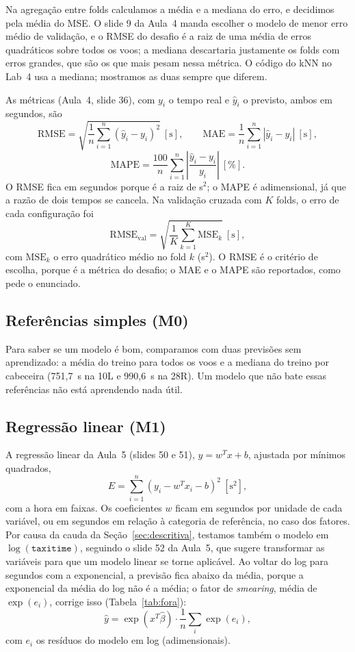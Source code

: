 \documentclass[12pt,a4paper]{article}
\begin{document}
Na agregação entre folds calculamos a média e a mediana do erro, e decidimos pela média do MSE. O slide 9 da Aula~4 manda escolher o modelo de menor erro médio de validação, e o RMSE do desafio é a raiz de uma média de erros quadráticos sobre todos os voos; a mediana descartaria justamente os folds com erros grandes, que são os que mais pesam nessa métrica. O código do kNN no Lab~4 usa a mediana; mostramos as duas sempre que diferem.

As métricas (Aula~4, slide 36), com $y_i$ o tempo real e $\hat{y}_i$ o previsto, ambos em segundos, são
\[
\text{RMSE} = \sqrt{\frac{1}{n}\sum_{i=1}^{n}(\hat{y}_i-y_i)^2}\ [\text{s}],\qquad
\text{MAE} = \frac{1}{n}\sum_{i=1}^{n}|\hat{y}_i-y_i|\ [\text{s}],
\]
\[
\text{MAPE} = \frac{100}{n}\sum_{i=1}^{n}\left|\frac{\hat{y}_i-y_i}{y_i}\right|\ [\%].
\]
O RMSE fica em segundos porque é a raiz de s$^2$; o MAPE é adimensional, já que a razão de dois tempos se cancela. Na validação cruzada com $K$ folds, o erro de cada configuração foi
\[
\text{RMSE}_{\text{val}} = \sqrt{\frac{1}{K}\sum_{k=1}^{K}\text{MSE}_k}\ [\text{s}],
\]
com $\text{MSE}_k$ o erro quadrático médio no fold $k$ (s$^2$). O RMSE é o critério de escolha, porque é a métrica do desafio; o MAE e o MAPE são reportados, como pede o enunciado.

\subsection{Referências simples (M0)}

Para saber se um modelo é bom, comparamos com duas previsões sem aprendizado: a média do treino para todos os voos e a mediana do treino por cabeceira (751,7~s na 10L e 990,6~s na 28R). Um modelo que não bate essas referências não está aprendendo nada útil.

\subsection{Regressão linear (M1)}\label{sec:m1}

A regressão linear da Aula~5 (slides 50 e 51), $y=w^{T}x+b$, ajustada por mínimos quadrados,
\[
E=\sum_{i=1}^{n}\left(y_i-w^{T}x_i-b\right)^2\ [\text{s}^2],
\]
com a hora em faixas. Os coeficientes $w$ ficam em segundos por unidade de cada variável, ou em segundos em relação à categoria de referência, no caso dos fatores. Por causa da cauda da Seção~\ref{sec:descritiva}, testamos também o modelo em $\log(\texttt{taxitime})$, seguindo o slide 52 da Aula~5, que sugere transformar as variáveis para que um modelo linear se torne aplicável. Ao voltar do log para segundos com a exponencial, a previsão fica abaixo da média, porque a exponencial da média do log não é a média; o fator de \textit{smearing}, média de $\exp(e_i)$, corrige isso (Tabela~\ref{tab:fora}):
\[
\hat{y}=\exp(x^{T}\hat{\beta})\cdot\frac{1}{n}\sum_i \exp(e_i),
\]
com $e_i$ os resíduos do modelo em log (adimensionais).
\end{document}
